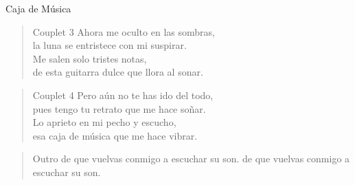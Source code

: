 \begin{song}[vals]{Caja de M\'usica}
\begin{verse}{Couplet 3}
    Ahora me oculto en las sombras,\\
    la luna se entristece con mi suspirar.\\
    Me salen solo tristes notas,\\
    de esta guitarra dulce que llora al sonar.
\end{verse}

\begin{verse}{Couplet 4}
    Pero a\'un no te has ido del todo,\\
    pues tengo tu retrato que me hace so\~nar.\\
    Lo aprieto en mi pecho y escucho,\\
    esa caja de m\'usica que me hace vibrar.
\end{verse}

\begin{verse}{Outro}
    de que vuelvas conmigo a escuchar su son.
    de que vuelvas conmigo a escuchar su son.
\end{verse}
\end{song}

\begin{translation}

\end{translation}
